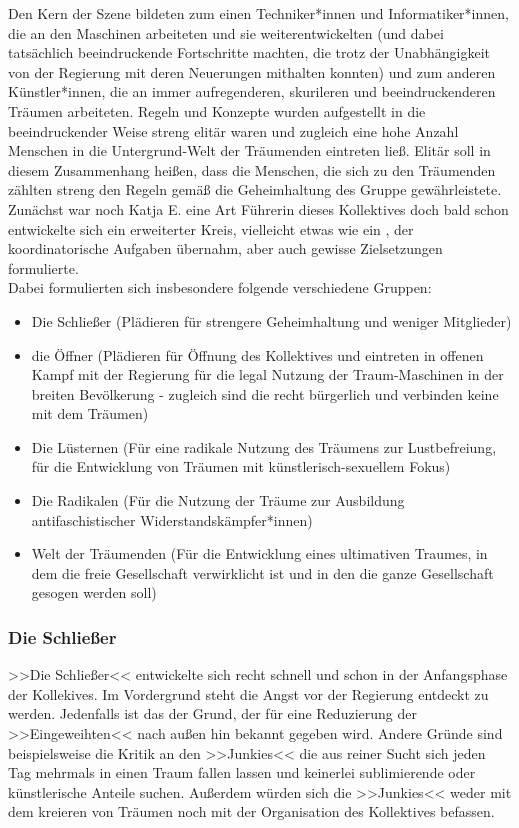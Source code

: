\documentclass[12pt, a4paper, openany]{report}
\begin{document}
Den Kern der Szene bildeten zum einen Techniker*innen und Informatiker*innen, die an den Maschinen arbeiteten und sie weiterentwickelten (und dabei tatsächlich beeindruckende Fortschritte machten, die trotz der Unabhängigkeit von der Regierung mit deren Neuerungen mithalten konnten) und zum anderen Künstler*innen, die an immer aufregenderen, skurileren und beeindruckenderen Träumen arbeiteten. 
Regeln und Konzepte wurden aufgestellt in die beeindruckender Weise streng elitär waren und zugleich eine hohe Anzahl Menschen in die Untergrund-Welt der Träumenden eintreten ließ.
Elitär soll in diesem Zusammenhang heißen, dass die Menschen, die sich zu den Träumenden zählten streng den Regeln gemäß die Geheimhaltung des Gruppe gewährleistete. \\
Zunächst war noch Katja E. eine Art Führerin dieses Kollektives doch bald schon entwickelte sich ein erweiterter Kreis, vielleicht etwas wie ein , der koordinatorische Aufgaben übernahm, aber auch gewisse Zielsetzungen formulierte.\\
Dabei formulierten sich insbesondere folgende verschiedene Gruppen:
\begin{itemize}
  \setlength\itemsep{0em}
  \item Die Schließer (Plädieren für strengere Geheimhaltung und weniger Mitglieder)
  \item die Öffner (Plädieren für Öffnung des Kollektives und eintreten in offenen Kampf mit der Regierung für die legal Nutzung der Traum-Maschinen in der breiten Bevölkerung - zugleich sind die recht bürgerlich und verbinden keine  mit dem Träumen)
  \item Die Lüsternen (Für eine radikale Nutzung des Träumens zur Lustbefreiung, für die Entwicklung von Träumen mit künstlerisch-sexuellem Fokus)
  \item Die Radikalen (Für die Nutzung der Träume zur Ausbildung antifaschistischer Widerstandskämpfer*innen)
  \item Welt der Träumenden (Für die Entwicklung eines ultimativen Traumes, in dem die freie Gesellschaft verwirklicht ist und in den die ganze Gesellschaft gesogen werden soll)
\end{itemize}

\subsubsection{Die Schließer}
>>Die Schließer<< entwickelte sich recht schnell und schon in der Anfangsphase der Kollekives. 
Im Vordergrund steht die Angst vor der Regierung entdeckt zu werden. 
Jedenfalls ist das der Grund, der für eine Reduzierung der >>Eingeweihten<< nach außen hin bekannt gegeben wird. 
Andere Gründe sind beispielsweise die Kritik an den >>Junkies<< die aus reiner Sucht sich jeden Tag mehrmals in einen Traum fallen lassen und keinerlei sublimierende oder künstlerische Anteile suchen. Außerdem würden sich die >>Junkies<< weder mit dem kreieren von Träumen noch mit der Organisation des Kollektives befassen. 
\end{document}

